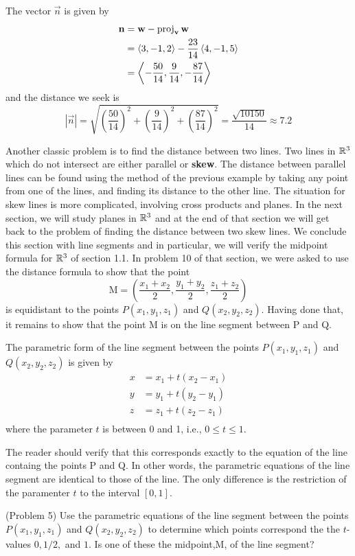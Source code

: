 \documentclass[handout]{ximera}
\begin{document}
\begin{example}[Example 4]
The vector $\vec{n}$ is given by
\begin{align*}
\mathbf{n} &= \mathbf{w} -  \operatorname{proj}_{\mathbf{v}} \mathbf{w}\\
&=\left\langle 3, -1, 2\right\rangle - \frac{23}{14}\left\langle 4,-1,5\right\rangle \\
&= \left\langle -\frac{50}{14},\frac{9}{14},-\frac{87}{14}\right\rangle
\end{align*}
and the distance we seek is
\[
|\vec{n}| = \sqrt{ \left(\frac{50}{14}\right)^2 +  \left(\frac{9}{14}\right)^2 + \left(\frac{87}{14}\right)^2} = \frac{\sqrt{10150}}{14}\approx 7.2
\]

\end{example}

Another classic problem is to find the distance between two lines.
Two lines in $\mathbb R^3$ which do not intersect are either parallel or {\bf skew}.  
The distance between parallel lines can be found using the method of the previous example by 
taking any point from one of the lines,
and finding its distance to the other line.
The situation for skew lines is more complicated, involving cross products and planes.
In the next section, we will study planes in $\mathbb R^3$ and at the end of that section we will get back to the 
problem of finding the distance between two skew lines.
We conclude this section with line segments and in particular, we will verify the 
midpoint formula for $\mathbb R^3$ of section 1.1.  In problem 10 of that section, we were asked to use the distance formula to 
show that the point 
\[
\text{M} = \left(\frac{x_1 + x_2}{2}, \frac{y_1 + y_2}{2}, \frac{z_1 + z_2}{2}\right)
\]
is equidistant to the points $P(x_1, y_1, z_1)$ and $Q(x_2, y_2, z_2)$. 
Having done that, it remains to show that the point M is on the line segment between P and Q.

\begin{definition}
The parametric form of the line segment between the points $P(x_1, y_1, z_1)$ and $Q(x_2, y_2, z_2)$
is given by
\begin{align*}
x &= x_1 + t(x_2 - x_1)\\
y &= y_1 + t(y_2 - y_1)\\
z &= z_1 + t(z_2 - z_1)\\
\end{align*}
where the parameter $t$ is between 0 and 1, i.e., $0 \leq t \leq 1$.
\end{definition}

The reader should verify that this corresponds exactly to the equation of the line containg the points P and Q.
In other words, the parametric equations of the line segment are identical to those of the line. 
The only difference is the restriction of the paramenter $t$ to the interval $[0,1]$. 

\begin{problem}(Problem 5)
Use the parametric equations of the line segment between the points  $P(x_1, y_1, z_1)$ and $Q(x_2, y_2, z_2)$
to determine which points correspond the the $t$-values $0, 1/2, $ and $1$. 
Is one of these the midpoint,M, of the line segment?
\end{problem}
 
\end{document}
